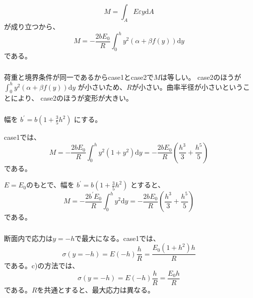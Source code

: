 \documentclass[a4paper]{jsarticle}
\begin{document}
\subsection{}
\subsubsection{}
\begin{equation}
  M = \int_A E \varepsilon y \mathrm{d} A
\end{equation}
が成り立つから、
\begin{equation}
  M = -\frac{2 b E_0}{R} \int_0^h y^2 (\alpha + \beta f(y)) \mathrm{d} y
\end{equation}
である。

\subsubsection{}
荷重と境界条件が同一であるからcase1とcase2で$M$は等しい。
case2のほうが
$\int_0^h y^2 (\alpha + \beta f(y)) \mathrm{d} y$
が小さいため、$R$が小さい。曲率半径が小さいということにより、
case2のほうが変形が大きい。

\subsubsection{}
幅を
$b^{\prime} = b \left(1 + \frac{3}{5} h^2\right)$
にする。\par
case1では、
\begin{equation}
  M = -\frac{2 b E_0}{R} \int_0^h y^2 (1 + y^2) \mathrm{d} y
  = -\frac{2 b E_0}{R} \left(\frac{h^3}{3} + \frac{h^5}{5}\right)
\end{equation}
である。\par
$E = E_0$のもとで、幅を
$b^{\prime} = b \left(1 + \frac{3}{5} h^2\right)$
とすると、
\begin{equation}
  M = -\frac{2 b^{\prime} E_0}{R} \int_0^h y^2 \mathrm{d} y
  = -\frac{2 b E_0}{R} \left(\frac{h^3}{3} + \frac{h^5}{5}\right)
\end{equation}
である。

\subsubsection{}
断面内で応力は$y = -h$で最大になる。case1では、
\begin{equation}
  \sigma(y = -h) = E(-h) \frac{h}{R}
  = \frac{E_0 (1 + h^2) h}{R}
\end{equation}
である。c)の方法では、
\begin{equation}
  \sigma(y = -h) = E(-h) \frac{h}{R}
  = \frac{E_0 h}{R}
\end{equation}
である。$R$を共通とすると、最大応力は異なる。
\end{document}
